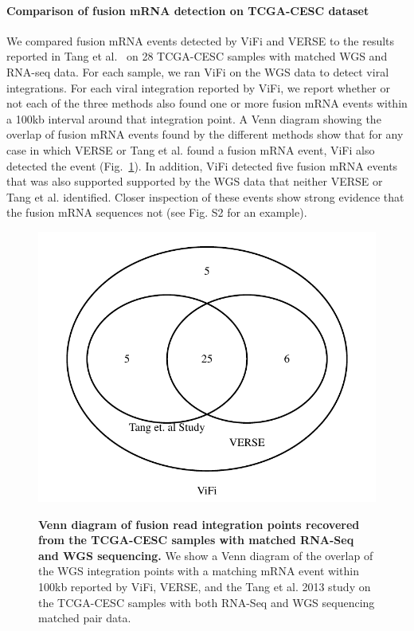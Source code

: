 \documentclass[10pt]{article}
\begin{document}
\paragraph{\textbf{Comparison of fusion mRNA detection on TCGA-CESC dataset}}
We compared fusion mRNA events detected by ViFi and VERSE to the results reported in Tang et al.~\cite{Tang2013} on 28 TCGA-CESC samples with matched WGS and RNA-seq data.  For each sample, we ran ViFi on the WGS data to detect viral integrations.  For each viral integration reported by ViFi, we report whether or not each of the three methods also found one or more fusion mRNA events within a 100kb interval around that integration point.  A Venn diagram showing the overlap of fusion mRNA events found by the different methods show that for any case in which VERSE or Tang et al. found a fusion mRNA event, ViFi also detected the event (Fig.~\ref{venn_diagram}).  In addition, ViFi detected five fusion mRNA events that was also supported supported by the WGS data that neither VERSE or Tang et al. identified.  Closer inspection of these events show strong evidence that the fusion mRNA sequences not (see Fig. S2 for an example).

\begin{figure}[htpb]
  \centering
  \includegraphics[width=1\linewidth]{results/tcga_triple.pdf}\\
\caption[Venn diagram of fusion reads recovered from the RNAseq data from Larsson 2013 study]
{\label{venn_diagram}  {\bf Venn diagram of fusion read integration points recovered from the TCGA-CESC samples with matched RNA-Seq and WGS sequencing.}  We show a Venn diagram of the overlap of the WGS integration points with a matching mRNA event within 100kb reported by ViFi, VERSE, and the Tang et al. 2013 study on the TCGA-CESC samples with both RNA-Seq and WGS sequencing matched pair data.  }
\end{figure}
\end{document}
